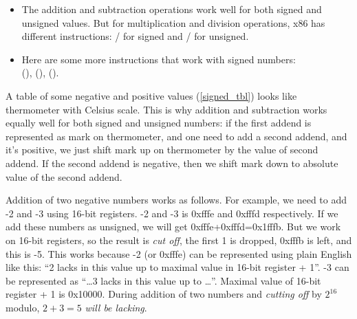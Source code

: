 \begin{itemize}
\item 
	The addition and subtraction operations work well for both signed and unsigned values.
	But for multiplication and division operations, x86 has different instructions:
	/ for signed and / for unsigned.
\item
	Here are some more instructions that work with signed numbers:\\
	 (),  (),  ().
\end{itemize}

A table of some negative and positive values (\ref{signed_tbl}) looks like thermometer with Celsius scale.
This is why addition and subtraction works equally well for both signed and unsigned numbers:
if the first addend is represented as mark on thermometer, and one need to add a second addend,
and it's positive, we just shift mark up on thermometer by the value of second addend.
If the second addend is negative, then we shift mark down to absolute value of the second addend.

Addition of two negative numbers works as follows.
For example, we need to add -2 and -3 using 16-bit registers.
-2 and -3 is 0xfffe and 0xfffd respectively.
If we add these numbers as unsigned, we will get 0xfffe+0xfffd=0x1fffb.
But we work on 16-bit registers, so the result is \emph{cut off}, the first 1 is dropped,
0xfffb is left, and this is -5.
This works because -2 (or 0xfffe) can be represented using plain English like this:
``2 lacks in this value up to maximal value in 16-bit register + 1''.
-3 can be represented as ``\dots 3 lacks in this value up to \dots''.
Maximal value of 16-bit register + 1 is 0x10000.
During addition of two numbers and \emph{cutting off} by $2^{16}$ modulo, $2+3=5$ \emph{will be lacking}.




